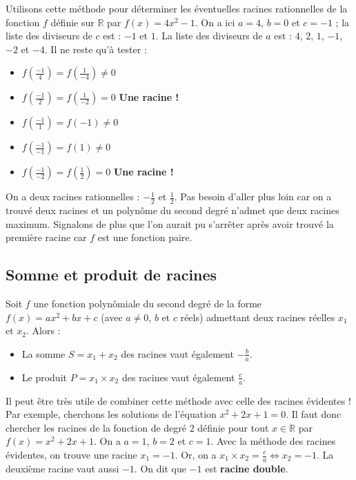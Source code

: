 	\begin{tip}[Exemple]
		Utilisons cette méthode pour déterminer les éventuelles racines rationnelles de la fonction $f$ définie sur $\mathbb{R}$ par $f(x) = 4x^2 - 1$.
		\newpar
		On a ici $a = 4$, $b = 0$ et $c = -1$ ; la liste des diviseurs de $c$ est : $-1$ et $1$.
		\newline
		La liste des diviseurs de $a$ est : $4$, $2$, $1$, $-1$, $-2$ et $-4$.
		Il ne reste qu'à tester :
		\begin{itemize}
			\item $f\left(\frac{-1}{4}\right)=f\left(\frac{1}{-4}\right) \neq 0$
			\item $f\left(\frac{-1}{2}\right)=f\left(\frac{1}{-2}\right)=0$ \textbf{Une racine !}
			\item $f\left(\frac{-1}{1}\right)=f(-1) \neq 0$
			\item $f\left(\frac{-1}{-1}\right)=f(1) \neq 0$
			\item $f\left(\frac{-1}{-2}\right)=f\left(\frac{1}{2}\right)=0$ \textbf{Une racine !}
		\end{itemize}
		On a deux racines rationnelles : $-\frac{1}{2}$ et $\frac{1}{2}$.
		\newpar
		Pas besoin d'aller plus loin car on a trouvé deux racines et un polynôme du second degré n'admet que deux racines maximum.
		\newpar
		Signalons de plus que l'on aurait pu s'arrêter après avoir trouvé la première racine car $f$ est une fonction paire.
	\end{tip}
	
	\subsection{Somme et produit de racines}
	
	\begin{formula}[Relations]
		Soit $f$ une fonction polynômiale du second degré de la forme $f(x) = ax^2 + bx +c$ (avec $a \neq 0$, $b$ et $c$ réels) admettant deux racines réelles $x_1$ et $x_2$. Alors :
		\begin{itemize}
			\item La somme $S = x_1 + x_2$ des racines vaut également $-\frac{b}{a}$.
			\item Le produit $P = x_1 \times x_2$ des racines vaut également $\frac{c}{a}$.
		\end{itemize}
	\end{formula}
	
	\begin{tip}[Exemple]
		Il peut être très utile de combiner cette méthode avec celle des racines évidentes !
		Par exemple, cherchons les solutions de l'équation $x^2 + 2x + 1 = 0$.
		\newpar
		Il faut donc chercher les racines de la fonction de degré 2 définie pour tout $x \in \mathbb{R}$ par $f(x) = x^2 + 2x + 1$.
		\newpar
		On a $a = 1$, $b = 2$ et $c = 1$. Avec la méthode des racines évidentes, on trouve une racine $x_1 = -1$.
		\newpar
		Or, on a $x_1 \times x_2 = \frac{c}{a} \iff x_2 = -1$. La deuxième racine vaut aussi $-1$.
		\newpar
		On dit que $-1$ est \textbf{racine double}.
	\end{tip}
	
